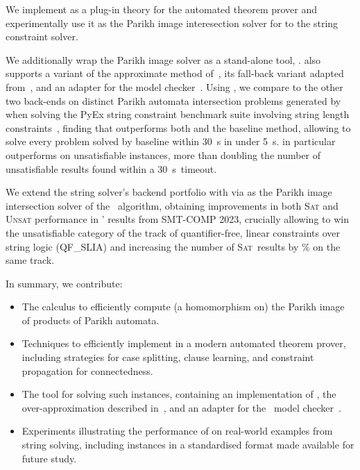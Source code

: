 We implement \Calculus{} as a plug-in theory for the \Princess{} automated
theorem prover and experimentally use it as the Parikh image interesection solver for
to the \Ostrich{} string constraint solver.

We additionally wrap the Parikh image solver as a stand-alone tool, \Catra{}.
\Catra{} also supports a variant of the approximate method of~\cite{approximate-parikh}, its fall-back variant adapted
from~\cite{generate-parikh-image}, and an adapter for the \Nuxmv{} model
checker~\cite{nuxmv}. Using \Catra, we compare \Calculus{} to the other two
back-ends on \NrBenchmarks{} distinct Parikh automata intersection problems
generated by \OstrichPlus{} when solving the PyEx string constraint benchmark
suite involving string length constraints~\cite{pyex}, finding that \Calculus{}
outperforms both \Nuxmv{} and the baseline method, allowing \Calculus{}
to solve every problem solved by baseline within \SI{30}{s} in under \SI{5}{s}.
\Calculus{} in particular outperforms \Nuxmv{} on unsatisfiable instances, more than 
doubling the number of unsatisfiable results found within a \SI{30}{s}~timeout.

We extend the \Ostrich{} string solver's backend portfolio with \Calculus{} via
\Catra{} as the Parikh image intersection solver of the \OstrichPlus{}~algorithm,
obtaining improvements in both \textsc{Sat}  and \textsc{Unsat} performance in
\Ostrich{}' results from SMT-COMP 2023, crucially allowing \Ostrich{} to win
the unsatisfiable category of the track of quantifier-free, linear constraints
over string logic (QF\_SLIA) and increasing the number of \textsc{Sat}~results
by \% on the same track.



In summary, we contribute:
\begin{itemize}
    \item The \Calculus{} calculus to efficiently compute (a homomorphism on)
          the Parikh image of products of Parikh automata.
    \item Techniques to efficiently implement \Calculus{} in a modern
    automated theorem prover, including strategies for case splitting, clause
    learning, and constraint propagation for connectedness.
    \item The \Catra{} tool for solving such instances, containing an
    implementation of \Calculus{}, the over-approximation described
    in~\cite{approximate-parikh}, and an adapter for the~\Nuxmv{} model
    checker~\cite{nuxmv}.
    \item Experiments illustrating the performance of \Calculus{} on real-world
    examples from string solving, including \NrBenchmarks{} instances in a
    standardised format made available for future study.
\end{itemize}

